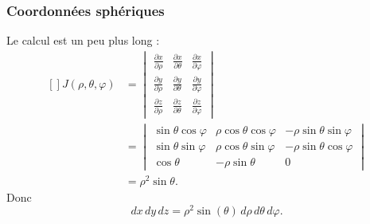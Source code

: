 \subsubsection{Coordonnées sphériques}

Le calcul est un peu plus long :
\begin{equation}
	\begin{aligned}[]
		J(\rho,\theta,\varphi) & =\begin{vmatrix}
			                          \frac{ \partial x }{ \partial \rho } & \frac{ \partial x }{ \partial \theta } & \frac{ \partial x }{ \partial \varphi } \\
			                          \frac{ \partial y }{ \partial \rho } & \frac{ \partial y }{ \partial \theta } & \frac{ \partial y }{ \partial \varphi } \\
			                          \frac{ \partial z }{ \partial \rho } & \frac{ \partial z }{ \partial \theta } & \frac{ \partial z }{ \partial \varphi }
		                          \end{vmatrix} \\
		                       & =
		\begin{vmatrix}
			\sin\theta\cos\varphi & \rho\cos\theta\cos\varphi & -\rho\sin\theta\sin\varphi \\
			\sin\theta\sin\varphi & \rho\cos\theta\sin\varphi & -\rho\sin\theta\cos\varphi \\
			\cos\theta            & -\rho\sin\theta           & 0
		\end{vmatrix}                                                                    \\
		                       & =\rho^2\sin\theta.
	\end{aligned}
\end{equation}
Donc
\begin{equation}
	dx\,dy\,dz=\rho^2\sin(\theta)\,d\rho\,d\theta\,d\varphi.
\end{equation}



